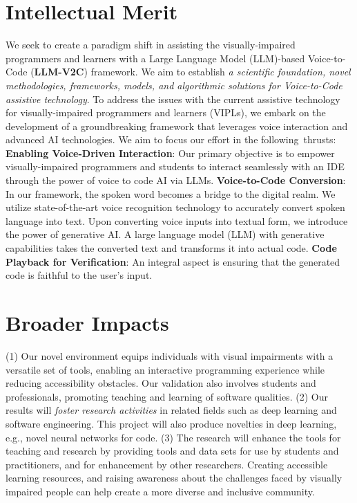 \documentclass[11pt]{article}
\newcommand{\tool}{\textsc{LLM-V2C}\xspace}
\begin{document}
\section{Intellectual Merit}

We seek to create a paradigm shift in assisting the visually-impaired
programmers and learners with a Large Language Model
(LLM)-based Voice-to-Code ({\bf LLM-V2C}) framework. We aim to establish {\em
  a scientific foundation, novel methodologies, frameworks, models,
  and algorithmic solutions for Voice-to-Code assistive technology}.
%
To address the issues with the current assistive technology for
visually-impaired programmers and learners (VIPLs), we embark on the
development of a groundbreaking framework that leverages voice
interaction and advanced AI technologies. We aim to focus our effort
in the following~thrusts: {\bf Enabling Voice-Driven Interaction}: Our
primary objective is to empower visually-impaired programmers and
students to interact seamlessly with an IDE through the power of voice
to code AI via LLMs. {\bf Voice-to-Code Conversion}: In our framework,
the spoken word becomes a bridge to the digital realm. We utilize
state-of-the-art voice recognition technology to accurately convert
spoken language into text. Upon converting voice inputs into textual
form, we introduce the power of generative AI. A large language model
(LLM) with generative capabilities takes the converted text and
transforms it into actual code. {\bf Code Playback for Verification}:
An integral aspect is ensuring that the generated code is faithful to
the user's input.
 
\section{Broader Impacts}


(1)
Our novel environment equips individuals with visual impairments with
a versatile set of tools, enabling an interactive programming
experience while reducing accessibility obstacles.
%
%
Our validation also involves students and professionals, promoting
teaching and learning of software qualities.
(2) Our results will {\em foster research activities} in related
fields such as deep learning and software engineering. This project
will also produce novelties in deep learning, e.g., novel neural
networks for code. (3) The research will enhance the tools for
teaching and research by providing tools and data sets for use by
students and practitioners, and for enhancement by other
researchers. Creating accessible learning resources, and raising
awareness about the challenges faced by visually impaired people
can help create a more diverse and inclusive community.
\end{document}
